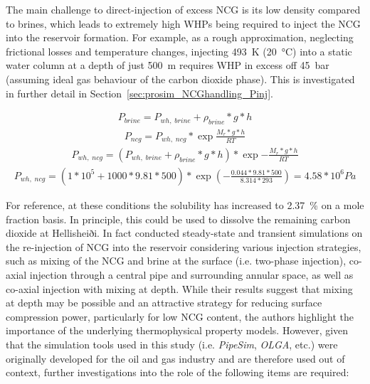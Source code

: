     The main challenge to direct-injection of excess \ac{NCG} is its low density compared to brines, which leads to extremely high \ac{WHP}s being required to inject the \ac{NCG} into the reservoir formation. For example, as a rough approximation, neglecting frictional losses and temperature changes, injecting \qty{493}{\K} (\qty{20}{\degreeCelsius}) into a static water column at a depth of just \qty{500}{m} requires \ac{WHP} in excess off \qty{45}{\bar} (assuming ideal gas behaviour of the carbon dioxide phase). This is investigated in further detail in Section~\ref{sec:prosim_NCGhandling_Pinj}.

    \begin{align}
        P_{brine} = P_{wh,\;brine} + \rho_{brine}*g*h
    \end{align}
    \begin{align}
        P_{ncg} = P_{wh,\;ncg} * \exp{\frac{M_r*g*h}{RT}}
    \end{align}
    \begin{align}
        P_{wh,\;ncg} = (P_{wh,\;brine} + \rho_{brine}*g*h) * \exp{-\frac{M_r*g*h}{RT}}
    \end{align}
    \begin{align}
        P_{wh,\;ncg} = (1*10^5 + 1000*9.81*500) * \exp{\left(-\frac{0.044*9.81*500}{8.314 * 293}\right)} = 4.58*10^6 Pa
    \end{align}

    For reference, at these conditions the solubility has increased to \qty{2.37}{\percent} on a mole fraction basis. In principle, this could be used to dissolve the remaining carbon dioxide at Hellisheiði. In fact \citeauthor{Leontidis2023} \cite{Leontidis2023} conducted steady-state and transient simulations on the re-injection of \ac{NCG} into the reservoir considering various injection strategies, such as mixing of the \ac{NCG} and brine at the surface (i.e. two-phase injection), co-axial injection through a central pipe and surrounding annular space, as well as co-axial injection with mixing at depth. While their results suggest that mixing at depth may be possible and an attractive strategy for reducing surface compression power, particularly for low \ac{NCG} content, the authors highlight the importance of the underlying thermophysical property models. However, given that the simulation tools used in this study (i.e. \emph{PipeSim}, \emph{OLGA}, etc.) were originally developed for the oil and gas industry and are therefore used out of context, further investigations into the role of the following items are required:


